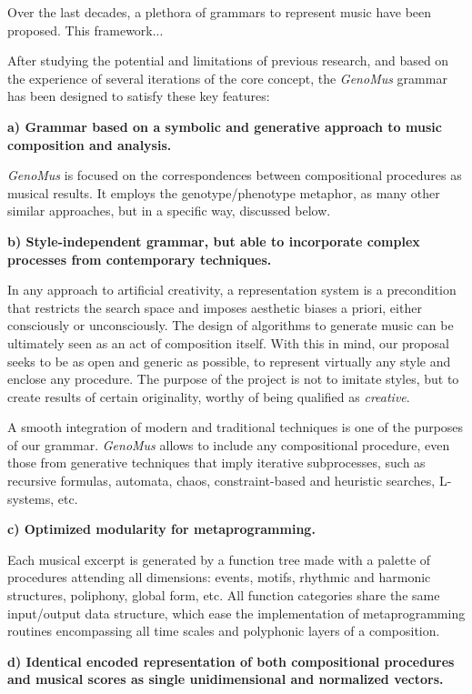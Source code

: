 \documentclass{article}
\begin{document}
Over the last decades, a plethora of grammars to represent music have been proposed. This framework...  

After studying the potential and limitations of previous research, and based on the experience of several iterations of the core concept, the \textsl{GenoMus} grammar has been designed to satisfy these key features:

\textbf{a) Grammar based on a symbolic and generative approach to music composition and analysis.}

\textsl{GenoMus} is focused on the correspondences between compositional procedures as musical results. It employs the genotype/phenotype metaphor, as many other similar approaches, but in a specific way, discussed below.

\textbf{b) Style-independent grammar, but able to incorporate complex processes from contemporary techniques.} 

In any approach to artificial creativity, a representation system is a precondition that restricts the search space and imposes aesthetic biases a priori, either consciously or unconsciously. The design of algorithms to generate music can be ultimately seen as an act of composition itself. With this in mind, our proposal seeks to be as open and generic as possible, to represent virtually any style and enclose any procedure. The purpose of the project is not to imitate styles, but to create results of certain originality, worthy of being qualified as \emph{creative}. 

A smooth integration of modern and traditional techniques is one of the purposes of our grammar. \textsl{GenoMus} allows to include any compositional procedure, even those from generative techniques that imply iterative subprocesses, such as recursive formulas, automata, chaos, constraint-based and heuristic searches, L-systems, etc. 

\textbf{c) Optimized modularity for metaprogramming.}

Each musical excerpt is generated by a function tree made with a palette of procedures attending all dimensions: events, motifs, rhythmic and harmonic structures, poliphony, global form, etc. All function categories share the same input/output data structure, which ease the implementation of metaprogramming routines encompassing all time scales and polyphonic layers of a composition.

\textbf{d) Identical encoded representation of both compositional procedures and musical scores as single unidimensional and normalized vectors.}
\end{document}

